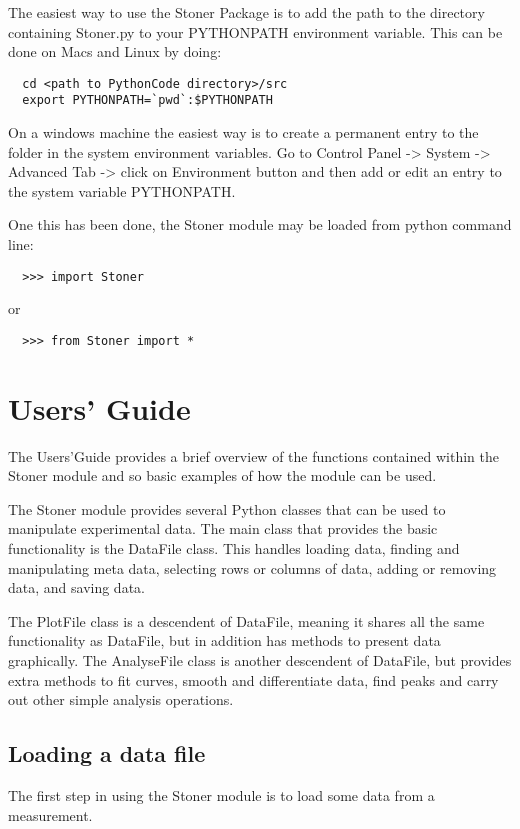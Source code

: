 \documentclass[a4paper,11pt]{scrartcl}
\begin{document}
The easiest way to use the Stoner Package is to add the path to the directory
containing Stoner.py to your PYTHONPATH environment variable. This can be done
on Macs and Linux by doing:
\begin{verbatim}
  cd <path to PythonCode directory>/src
  export PYTHONPATH=`pwd`:$PYTHONPATH
\end{verbatim}
On a windows machine the easiest way is to create a permanent entry to the
folder in the system environment variables. Go to Control Panel -> System ->
Advanced Tab -> click on Environment button and then add or edit an entry to the
system variable PYTHONPATH.

One this has been done, the Stoner module may be loaded from python command
line:

\begin{verbatim}
  >>> import Stoner
\end{verbatim}

or

\begin{verbatim}
  >>> from Stoner import *
\end{verbatim}

\section{Users' Guide}

The Users'Guide provides a brief overview of the functions contained within the
Stoner module and so basic examples of how the module can be used.

The Stoner module provides several Python classes that can be used to manipulate
experimental data. The main class that provides the basic functionality is the
DataFile class. This handles loading data, finding and manipulating meta data,
selecting rows or columns of data, adding or removing data, and saving data.

The PlotFile class is a descendent of DataFile, meaning it shares all the same
functionality as DataFile, but in addition has methods to present data
graphically. The AnalyseFile class is another descendent of DataFile, but
provides extra methods to fit curves, smooth and differentiate data, find peaks
and carry out other simple analysis operations.

\subsection{Loading a data file}

The first step in using the Stoner module is to load some data from a
measurement.
\end{document}
